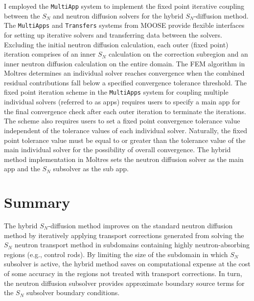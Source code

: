 I employed the \texttt{MultiApp} system \cite{gaston_physics-based_2015} to implement the fixed point
iterative coupling between the $S_N$ and neutron diffusion solvers for the hybrid $S_N$-diffusion method.
The \texttt{MultiApps} and \texttt{Transfers} systems from \gls{MOOSE} provide flexible interfaces
for setting up iterative solvers and transferring data between the solvers.
Excluding the initial neutron diffusion calculation,
each outer (fixed point) iteration comprises of an inner $S_N$ calculation on the correction
subregion and an inner neutron diffusion calculation on the entire domain. The \gls{FEM} algorithm
in Moltres determines an individual solver reaches convergence when the combined
residual contributions fall below a specified convergence tolerance threshold. The fixed point
iteration scheme in the \texttt{MultiApps} system for coupling multiple individual
solvers (referred to as apps) requires users to specify a main app for the final convergence check
after each outer iteration to terminate the iterations. The scheme also requires users to set a
fixed point convergence tolerance value independent of the tolerance values of each individual
solver. Naturally, the fixed point tolerance value must be equal to or greater than the tolerance
value of the main individual solver for the possibility of overall convergence. The hybrid method
implementation in Moltres sets the neutron diffusion solver as the main app and the $S_N$ subsolver
as the sub app.


\section{Summary} \label{sec:hybrid-summary}

The hybrid $S_N$-diffusion method improves on the standard neutron
diffusion method by iteratively applying transport corrections generated from solving the $S_N$
neutron transport
method in subdomains containing highly neutron-absorbing regions (e.g., control rods). By limiting
the size of the subdomain in which $S_N$ subsolver is active, the hybrid method saves on
computational expense at the cost of some accuracy in the regions not treated with transport
corrections. In turn, the neutron diffusion subsolver provides approximate boundary source terms
for the $S_N$ subsolver boundary conditions. 

